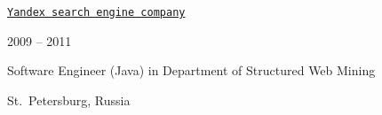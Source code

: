 \documentclass[10pt]{article}
\renewcommand{\section}[2]%
        {\pagebreak[2]\vspace{1.3\baselineskip}%
         \phantomsection\addcontentsline{toc}{section}{#1}%
         \hspace{0in}%
         \marginpar{
         \raggedright \scshape #1}#2}
\newenvironment{innerlist}[1][\enskip\textbullet]%
        {\begin{compactenum}[#1]}{\end{compactenum}}
\newcommand{\blankline}{\quad\pagebreak[2]}
\begin{document}
\blankline

\href{http://company.yandex.com/}{\tt Yandex search engine company}%
\begin{innerlist}
  \item 2009 -- 2011
  \item Software Engineer (Java) in Department of Structured Web Mining
  \item St.~Petersburg, Russia
\end{innerlist}

%
%  
%






%
%


%
\end{document}
